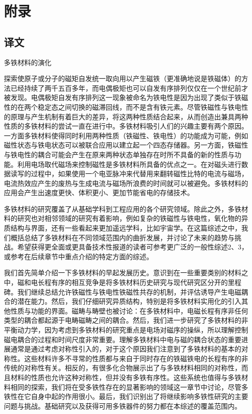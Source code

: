 \chapter*{附录}

\section*{译文}

多铁材料的演化

探索使原子或分子的磁矩自发统一取向用以产生磁铁（更准确地说是铁磁体）的方法已经持续了两千五百多年，而电偶极矩也可以自发有序排列仅仅在一个世纪前才被发现。电偶极矩自发有序排列这一现象被命名为铁电性是因为出现了类似于铁磁性的在两个稳定态之间切换的磁滞回线，而不是含有铁元素。尽管铁磁性与铁电性的原理与产生机制有着巨大的差异，将这两种性质结合起来，从而创造出兼具两种性质的多铁材料的尝试一直在进行中。多铁材料吸引人们的兴趣主要有两个原因。一方面多铁材料使得同时利用两种性质（铁磁性、铁电性）的功能成为可能，例如磁性状态与铁电状态可以被联合应用以建立起一个四态存储器。另一方面，铁磁性与铁电性的耦合可能会产生在原来两种状态单独存在时所不具备的新的性质与功能。利用电场取代磁场来控制磁性是多铁材料所具备的优点之一。在对磁头进行数据读写的过程中，如果使用一个电亚脉冲来代替用来翻转磁性比特的电流与磁场，电流热效应产生的废热与生成电流与磁场所浪费的时间就可以被避免。多铁材料的应用会产生出速度更快、体积更小、更加节能省电的存储技术。

多铁材料的研究覆盖了从基础学科到工程应用的各个研究领域。除此之外，多铁材料的研究也对相邻领域的研究有着影响，例如复杂的铁磁性与铁电性，氧化物的异质结构与界面，还有一些看起来更加遥远学科，比如宇宙学。在这篇综述之中，我们概括总结了多铁材料在不同领域范围内的曲折发展，并讨论了未来的趋势与挑战。希望获得更全面或更具备技术性报道的读者可参考更广泛的一般性综述2、3，或参考在后续章节中重点介绍的特定方面的综述。

我们首先简单介绍一下多铁材料的早起发展历史。意识到在一些重要类别的材料之中，磁和电长程有序的相互竞争是将多铁材料历史研究与现代研究区分开的里程碑。我们继续总结允许铁磁性与铁电性铁磁性共存的机制，并评估诱导产生电磁耦合的潜在能力。然后，我们仔细研究异质结构，特别是将多铁材料实用化的引入其他性质与功能的界面。磁畴与畴壁也被讨论：在多铁材料中，电磁长程有序非任何类型的耦合都起源于电畴磁畴之间的耦合。然后，我们进一步研究了多铁材料的非平衡动力学，因为考虑到多铁材料的研究重点是电场对磁序的操纵，所以理解控制磁电耦合的过程和时间尺度非常重要。理解多铁材料中电与磁的耦合状态的重要进展通常是通过考虑对称性引入的，对于这个原因我们注意到了多铁材料的基本的对称性。这些材料许多不寻常的性质都与来自于同时存在的铁磁铁电的长程有序的非传统的对称性有关。相反的，有很多化合物展示出了与多铁材料相同的对称性，而且材料的性质也允许这种对称性，但并没有多铁有序性。这些系统也值得与多铁材料相同的探索，我们将在受多铁性存在的显著影响的领域这一章节中讨论，尽管多铁性在它自身中起的作用很小。最后，我们识别出了将继续影响多铁性研究的主要问题与挑战。基础研究以及获得可用多铁器件的努力都在本综述的覆盖范围内。

